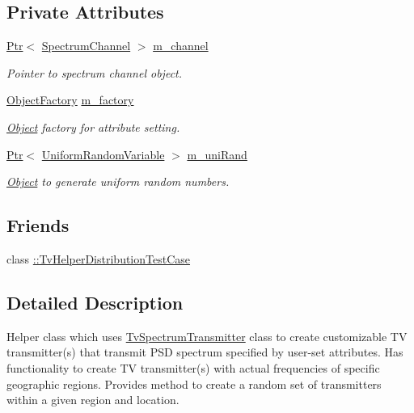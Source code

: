 \subsection*{Private Attributes}
\begin{DoxyCompactItemize}
\item 
\hyperlink{classns3_1_1Ptr}{Ptr}$<$ \hyperlink{classns3_1_1SpectrumChannel}{Spectrum\+Channel} $>$ \hyperlink{classns3_1_1TvSpectrumTransmitterHelper_afc92164bf4a2a99985189207ee3a53a8}{m\+\_\+channel}
\begin{DoxyCompactList}\small\item\em Pointer to spectrum channel object. \end{DoxyCompactList}\item 
\hyperlink{classns3_1_1ObjectFactory}{Object\+Factory} \hyperlink{classns3_1_1TvSpectrumTransmitterHelper_ae89194664bc52ed899f7dd0d074e588c}{m\+\_\+factory}
\begin{DoxyCompactList}\small\item\em \hyperlink{classns3_1_1Object}{Object} factory for attribute setting. \end{DoxyCompactList}\item 
\hyperlink{classns3_1_1Ptr}{Ptr}$<$ \hyperlink{classns3_1_1UniformRandomVariable}{Uniform\+Random\+Variable} $>$ \hyperlink{classns3_1_1TvSpectrumTransmitterHelper_ac0914f5455dbfa49826f0879635693e6}{m\+\_\+uni\+Rand}
\begin{DoxyCompactList}\small\item\em \hyperlink{classns3_1_1Object}{Object} to generate uniform random numbers. \end{DoxyCompactList}\end{DoxyCompactItemize}
\subsection*{Friends}
\begin{DoxyCompactItemize}
\item 
class \hyperlink{classns3_1_1TvSpectrumTransmitterHelper_a1d475d484c6218f84bf4f5e051773fb5}{\+::\+Tv\+Helper\+Distribution\+Test\+Case}
\end{DoxyCompactItemize}


\subsection{Detailed Description}
Helper class which uses \hyperlink{classns3_1_1TvSpectrumTransmitter}{Tv\+Spectrum\+Transmitter} class to create customizable TV transmitter(s) that transmit P\+SD spectrum specified by user-\/set attributes. Has functionality to create TV transmitter(s) with actual frequencies of specific geographic regions. Provides method to create a random set of transmitters within a given region and location.

